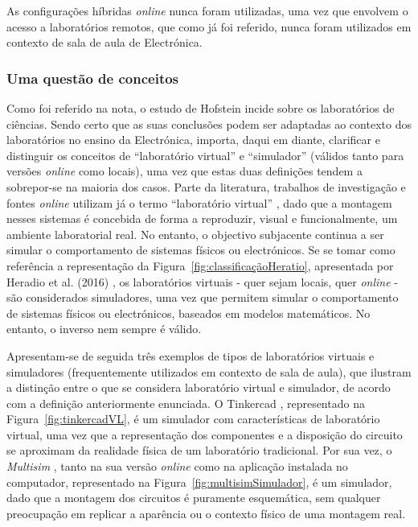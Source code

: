 As configurações híbridas \textit{online} nunca foram utilizadas, uma vez que envolvem o acesso a laboratórios remotos, que como já foi referido, nunca foram utilizados  em contexto de sala de aula de Electrónica.

\subsubsection{Uma questão de conceitos}
\label{sec:questaodeconceitos}
Como foi referido na nota, o estudo de Hofstein incide sobre os laboratórios de ciências. Sendo certo que as suas conclusões podem ser adaptadas ao contexto dos laboratórios no ensino da Electrónica, importa, daqui em diante, clarificar e distinguir os conceitos de ``laboratório virtual'' e ``simulador'' (válidos tanto para versões \textit{online} como locais), uma vez que estas duas definições tendem a sobrepor-se na maioria dos casos. Parte da literatura, trabalhos de investigação e fontes \textit{online} utilizam já o termo ``laboratório virtual'' \cite{BRINSON2015218, virtuallabng, EMaster2024May}, dado que a montagem nesses sistemas é concebida de forma a reproduzir, visual e funcionalmente, um ambiente laboratorial real. No entanto, o objectivo subjacente continua a ser simular o comportamento de sistemas físicos ou electrónicos. Se se tomar como referência a representação da Figura~\ref{fig:classificaçãoHeratio}, apresentada por Heradio et al. (2016) \cite{HERADIO20161}, os laboratórios virtuais - quer sejam locais, quer \textit{online} - são considerados simuladores, uma vez que permitem simular o comportamento de sistemas físicos ou electrónicos, baseados em modelos matemáticos. No entanto, o inverso nem sempre é válido.

Apresentam-se de seguida três exemplos de tipos de laboratórios virtuais e simuladores (frequentemente utilizados em contexto de sala de aula), que ilustram a distinção entre o que se considera laboratório virtual e simulador, de acordo com a definição anteriormente enunciada. O Tinkercad \cite{tinkercad}, representado na Figura~\ref{fig:tinkercadVL}, é um simulador com características de laboratório virtual, uma vez que a representação dos componentes e a disposição do circuito se aproximam da realidade física de um laboratório tradicional. Por sua vez, o \textit{Multisim} \cite{multisim}, tanto na sua versão \textit{online} como na aplicação instalada no computador, representado na Figura~\ref{fig:multisimSimulador}, é um simulador, dado que a montagem dos circuitos é puramente esquemática, sem qualquer preocupação em replicar a aparência ou o contexto físico de uma montagem real.

